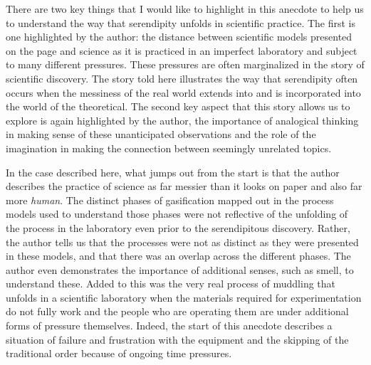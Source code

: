 \documentclass[authordate, commentary]{jote-new-article}
\begin{document}
	There are two key things that I would like to highlight in this anecdote to help us to understand the way that serendipity unfolds in scientific practice. The first is one highlighted by the author: the distance between scientific models presented on the page and science as it is practiced in an imperfect laboratory and subject to many different pressures. These pressures are often marginalized in the story of scientific discovery. The story told here illustrates the way that serendipity often occurs when the messiness of the real world extends into and is incorporated into the world of the theoretical. The second key aspect that this story allows us to explore is again highlighted by the author, the importance of analogical thinking in making sense of these unanticipated observations and the role of the imagination in making the connection between seemingly unrelated topics.



	In the case described here, what jumps out from the start is that the author describes the practice of science as far messier than it looks on paper and also far more \emph{human}. The distinct phases of gasification mapped out in the process models used to understand those phases were not reflective of the unfolding of the process in the laboratory even prior to the serendipitous discovery. Rather, the author tells us that the processes were not as distinct as they were presented in these models, and that there was an overlap across the different phases. The author even demonstrates the importance of additional senses, such as smell, to understand these. Added to this was the very real process of muddling that unfolds in a scientific laboratory when the materials required for experimentation do not fully work and the people who are operating them are under additional forms of pressure themselves. Indeed, the start of this anecdote describes a situation of failure and frustration with the equipment and the skipping of the traditional order because of ongoing time pressures.
\end{document}
